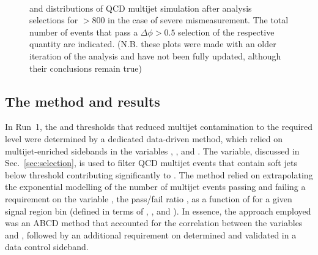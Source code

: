 \begin{figure}[!h]
 \centering
  \\
 \caption{\bdphi and \dphimhtj distributions of QCD multijet simulation
 after analysis selections for \scalht $> 800$ \GeV in the case of
 severe mismeasurement. The
 total number of events that pass a $\Delta\phi > 0.5$ selection of the
 respective quantity are indicated. (N.B. these plots were made with
 an older iteration of the analysis and have not been fully updated,
 although their conclusions remain true)}
 \label{fig:bDPhi_mismeasured}
\end{figure}

\subsection{The method and results}
\label{sec:qcdMethod}

In Run~1, the \alphat and \bdphi thresholds that reduced
multijet contamination to the required level were determined by a
dedicated data-driven method, which relied on multijet-enriched
sidebands in the variables \alphat, \bdphi, and \mhtmet. The \mhtmet
variable, discussed in Sec.~\ref{sec:selection}, is used to filter QCD
multijet events that contain soft jets below threshold contributing
significantly to \mht. The method relied on extrapolating the
exponential modelling of the number of multijet events passing and
failing a requirement on the variable \mhtmet, \ie the pass/fail ratio
\rmhtmet, as a function of \alphat for a given signal region bin
(defined in terms of \njet, \nb, and \scalht). In essence, the
approach employed was an ABCD method that accounted for the
correlation between the variables \rmhtmet and \alphat, followed
by an additional requirement on \bdphi determined and validated in a
data control sideband.


